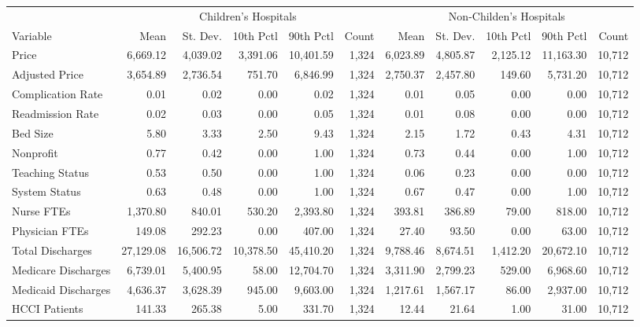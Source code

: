 \begin{table}[H]
\centering
\begin{tabular}{lrrrrrrrrrr}
\toprule
\multicolumn{1}{c}{ } & \multicolumn{5}{c}{Children's Hospitals} & \multicolumn{5}{c}{Non-Childen's Hospitals} \\
\cmidrule(l{3pt}r{3pt}){2-6} \cmidrule(l{3pt}r{3pt}){7-11}
Variable & Mean & St. Dev. & 10th Pctl & 90th Pctl & Count & Mean & St. Dev. & 10th Pctl & 90th Pctl & Count\\
\midrule
Price & 6,669.12 & 4,039.02 & 3,391.06 & 10,401.59 & 1,324 & 6,023.89 & 4,805.87 & 2,125.12 & 11,163.30 & 10,712\\
Adjusted Price & 3,654.89 & 2,736.54 & 751.70 & 6,846.99 & 1,324 & 2,750.37 & 2,457.80 & 149.60 & 5,731.20 & 10,712\\
Complication Rate & 0.01 & 0.02 & 0.00 & 0.02 & 1,324 & 0.01 & 0.05 & 0.00 & 0.00 & 10,712\\
Readmission Rate & 0.02 & 0.03 & 0.00 & 0.05 & 1,324 & 0.01 & 0.08 & 0.00 & 0.00 & 10,712\\
Bed Size & 5.80 & 3.33 & 2.50 & 9.43 & 1,324 & 2.15 & 1.72 & 0.43 & 4.31 & 10,712\\
\addlinespace
Nonprofit & 0.77 & 0.42 & 0.00 & 1.00 & 1,324 & 0.73 & 0.44 & 0.00 & 1.00 & 10,712\\
Teaching Status & 0.53 & 0.50 & 0.00 & 1.00 & 1,324 & 0.06 & 0.23 & 0.00 & 0.00 & 10,712\\
System Status & 0.63 & 0.48 & 0.00 & 1.00 & 1,324 & 0.67 & 0.47 & 0.00 & 1.00 & 10,712\\
Nurse FTEs & 1,370.80 & 840.01 & 530.20 & 2,393.80 & 1,324 & 393.81 & 386.89 & 79.00 & 818.00 & 10,712\\
Physician FTEs & 149.08 & 292.23 & 0.00 & 407.00 & 1,324 & 27.40 & 93.50 & 0.00 & 63.00 & 10,712\\
\addlinespace
Total Discharges & 27,129.08 & 16,506.72 & 10,378.50 & 45,410.20 & 1,324 & 9,788.46 & 8,674.51 & 1,412.20 & 20,672.10 & 10,712\\
Medicare Discharges & 6,739.01 & 5,400.95 & 58.00 & 12,704.70 & 1,324 & 3,311.90 & 2,799.23 & 529.00 & 6,968.60 & 10,712\\
Medicaid Discharges & 4,636.37 & 3,628.39 & 945.00 & 9,603.00 & 1,324 & 1,217.61 & 1,567.17 & 86.00 & 2,937.00 & 10,712\\
HCCI Patients & 141.33 & 265.38 & 5.00 & 331.70 & 1,324 & 12.44 & 21.64 & 1.00 & 31.00 & 10,712\\
\bottomrule
\end{tabular}
\end{table}

